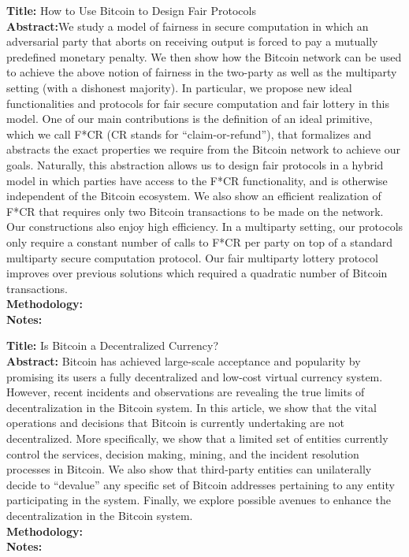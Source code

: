 \documentclass[a4paper, 12pt]{scrartcl}
\begin{document}
\textbf{Title:} How to Use Bitcoin to Design Fair Protocols \parencite{bentov2014} \\
\textbf{Abstract:}We study a model of fairness in secure computation in which an adversarial party that aborts on receiving output is forced to pay a mutually predefined monetary penalty. We then show how the Bitcoin network can be used to achieve the above notion of fairness in the two-party as well as the multiparty setting (with a dishonest majority). In particular, we propose new ideal functionalities and protocols for fair secure computation and fair lottery in this model.
One of our main contributions is the definition of an ideal primitive, which we call F*CR (CR stands for “claim-or-refund”), that formalizes and abstracts the exact properties we require from the Bitcoin network to achieve our goals. Naturally, this abstraction allows us to design fair protocols in a hybrid model in which parties have access to the F*CR functionality, and is otherwise independent of the Bitcoin ecosystem. We also show an efficient realization of 
F*CR that requires only two Bitcoin transactions to be made on the network.
Our constructions also enjoy high efficiency. In a multiparty setting, our protocols only require a constant number of calls to F*CR per party on top of a standard multiparty secure computation protocol. Our fair multiparty lottery protocol improves over previous solutions which required a quadratic number of Bitcoin transactions.\\
\textbf{Methodology:} \\
\textbf{Notes:}


\textbf{Title:} Is Bitcoin a Decentralized Currency? \parencite{10.1109/MSP.2014.49} \\
\textbf{Abstract:} Bitcoin has achieved large-scale acceptance and popularity by promising its users a fully
decentralized and low-cost virtual currency system. However, recent incidents and observations
are revealing the true limits of decentralization in the Bitcoin system. In this article, we
show that the vital operations and decisions that Bitcoin is currently undertaking are not
decentralized. More specifically, we show that a limited set of entities currently control the
services, decision making, mining, and the incident resolution processes in Bitcoin. We also
show that third-party entities can unilaterally decide to “devalue” any specific set of Bitcoin
addresses pertaining to any entity participating in the system. Finally, we explore possible
avenues to enhance the decentralization in the Bitcoin system.\\
\textbf{Methodology:} \\
\textbf{Notes:} 
\end{document}

